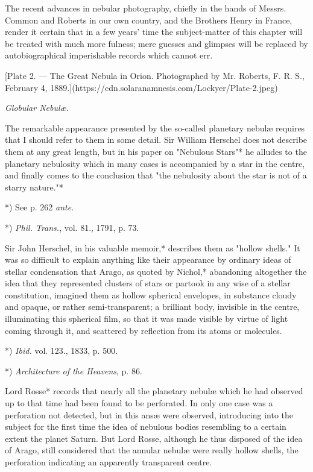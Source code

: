 \documentclass[a4paper, 12pt, oneside, polutonikogreek, english]{article}
\begin{document}
The recent advances in nebular photography, chiefly in the hands of Messrs. Common and Roberts in our own country, and the Brothers Henry in France, render it certain that in a few years' time the subject-matter of this chapter will be treated with much more fulness; mere guesses and glimpses will be replaced by autobiographical imperishable records which cannot err.

[Plate 2. --- The Great Nebula in Orion. Photographed by Mr. Roberts, F. R. S., February 4, 1889.](https://cdn.solaranamnesis.com/Lockyer/Plate-2.jpeg)

\emph{Globular Nebulæ.}

The remarkable appearance presented by the so-called planetary nebulæ requires that I should refer to them in some detail. Sir William Herschel does not describe them at any great length, but in his paper on "Nebulous Stars"* he alludes to the planetary nebulosity which in many cases is accompanied by a star in the centre, and finally comes to the conclusion that "the nebulosity about the star is not of a starry nature."*

*) See p. 262 \emph{ante.}

*) \emph{Phil. Trans.}, vol. 81., 1791, p. 73.

Sir John Herschel, in his valuable memoir,* describes them as "hollow shells." It was so difficult to explain anything like their appearance by ordinary ideas of stellar condensation that Arago, as quoted by Nichol,* abandoning altogether the idea that they represented clusters of stars or partook in any wise of a stellar constitution, imagined them as hollow spherical envelopes, in substance cloudy and opaque, or rather semi-transparent; a brilliant body, invisible in the centre, illuminating this spherical film, so that it was made visible by virtue of light coming through it, and scattered by reflection from its atoms or molecules.

*) \emph{Ibid.} vol. 123., 1833, p. 500.

*) \emph{Architecture of the Heavens}, p. 86.

Lord Rosse* records that nearly all the planetary nebulæ which he had observed up to that time had been found to be perforated. In only one case was a perforation not detected, but in this ansæ were observed, introducing into the subject for the first time the idea of nebulous bodies resembling to a certain extent the planet Saturn. But Lord Rosse, although he thus disposed of the idea of Arago, still considered that the annular nebulæ were really hollow shells, the perforation indicating an apparently transparent centre.
\end{document}
